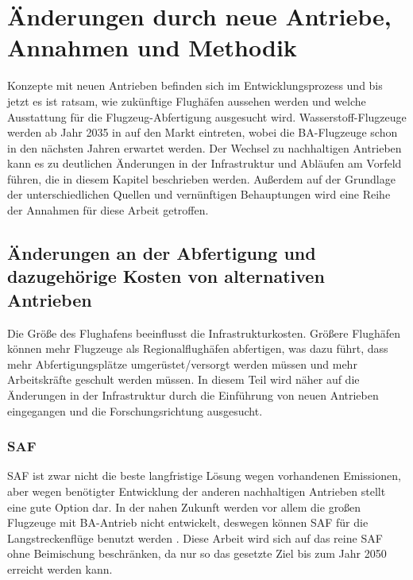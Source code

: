 \chapter{Änderungen durch neue Antriebe, Annahmen und Methodik}
\label{ch:Änderungen durch neue Antriebe, Annahmen und Methodik}

Konzepte mit neuen Antrieben befinden sich im Entwicklungsprozess und bis jetzt es ist ratsam, wie zukünftige Flughäfen aussehen werden
und welche Ausstattung für die Flugzeug-Abfertigung ausgesucht wird. Wasserstoff-Flugzeuge werden ab Jahr 2035 in 
auf den Markt eintreten, wobei die BA-Flugzeuge schon in den nächsten Jahren erwartet werden.
Der Wechsel zu nachhaltigen Antrieben kann es zu deutlichen Änderungen in der Infrastruktur und Abläufen am Vorfeld führen, die
in diesem Kapitel beschrieben werden.
Außerdem auf der Grundlage der unterschiedlichen Quellen und vernünftigen Behauptungen wird eine Reihe der Annahmen für diese Arbeit getroffen.
%

\section{Änderungen an der Abfertigung und dazugehörige Kosten von alternativen Antrieben}
\label{s:Änderungen an der Abfertigung und dazugehörige Kosten von alternativen Antrieben}

Die Größe des Flughafens beeinflusst die Infrastrukturkosten. Größere Flughäfen können mehr Flugzeuge als Regionalflughäfen 
abfertigen, was dazu führt, dass mehr Abfertigungsplätze umgerüstet/versorgt werden müssen und mehr Arbeitskräfte geschult werden müssen. 
In diesem Teil wird näher auf die Änderungen in der Infrastruktur durch die Einführung von neuen Antrieben eingegangen und 
die Forschungsrichtung ausgesucht.

\subsection{SAF}
SAF ist zwar nicht die beste langfristige Lösung wegen vorhandenen Emissionen, aber wegen benötigter Entwicklung der anderen nachhaltigen
Antrieben stellt eine gute Option dar. In der nahen Zukunft werden vor allem die großen Flugzeuge mit BA-Antrieb nicht entwickelt, 
deswegen können SAF für die Langstreckenflüge benutzt werden \cite{dalmia2022powering}.
Diese Arbeit wird sich auf das reine SAF ohne Beimischung beschränken, da nur so das gesetzte Ziel bis zum Jahr 2050 erreicht werden kann.

